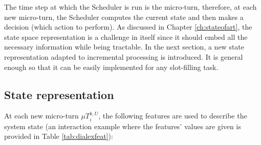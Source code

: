              The time step at which the Scheduler is run is the micro-turn, therefore, at each new micro-turn, the Scheduler computes the current state and then makes a decision (which action to perform). As discussed in Chapter \ref{ch:stateofart}, the state space representation is a challenge in itself since it should embed all the necessary information while being tractable. In the next section, a new state representation adapted to incremental processing is introduced. It is general enough so that it can be easily implemented for any slot-filling task.

	\subsection{State representation}
    
    	At each new micro-turn $\mu T^{k,U}_i$, the following features are used to describe the system state (an interaction example where the features' values are given is provided in Table \ref{tab:dialexfeat}):
        
